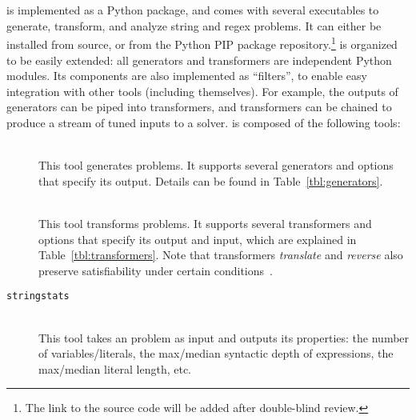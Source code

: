 \section{\fuzzer{}}
\label{sec:fuzzer}

\fuzzer{} is implemented as a Python package, and comes with several
executables to generate, transform, and analyze \smtfull{} string and regex
problems. It can either be installed from source, or from the Python
PIP package repository.\footnote{The link to the
source code will be added after double-blind review.}
\fuzzer{} is organized to be easily extended:
all generators and transformers are independent Python modules. Its
components are also implemented as \unix{} ``filters'', to enable easy
integration with other tools (including themselves). For example, the
outputs of generators can be piped into transformers, and transformers
can be chained to produce a stream of tuned inputs to a
solver. \fuzzer{} is composed of the following tools:
\begin{description}
    \item[\generator{}] \hfill \\
        This tool generates \smt{} problems. It supports several generators and
        options that specify its output. Details can be found in
        Table~\ref{tbl:generators}.
    \item[\transformer{}] \hfill \\
        This tool transforms \smt{}
        problems. It supports several transformers and options that specify
        its output and input, which are explained in
        Table~\ref{tbl:transformers}. Note that transformers
        \textit{translate} and \textit{reverse} also preserve
        satisfiability under certain conditions~\cite{ifaz}.
    \item[\texttt{stringstats}] \hfill \\
        This tool takes an \smt{}
        problem as input and outputs its properties: the number of
        variables/literals, the max/median syntactic depth of expressions, the
        max/median literal length, etc.
\end{description}

